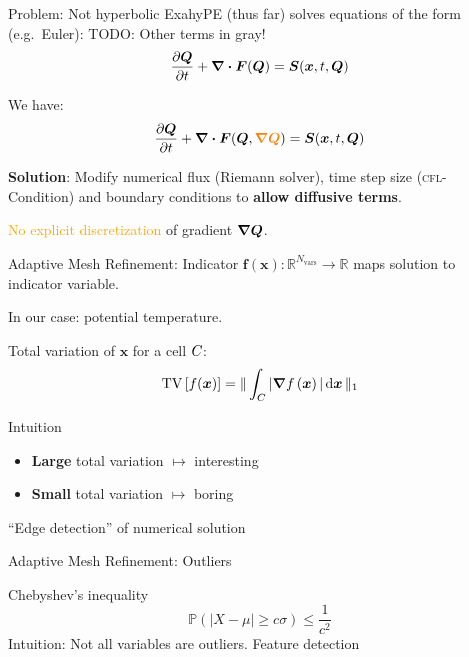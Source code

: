 \documentclass[aspectratio=169]{beamer}
\begin{document}
\begin{frame}{Problem: Not hyperbolic}
  ExahyPE (thus far) solves equations of the form (e.g.\ Euler):
  TODO: Other terms in gray!
  \begin{equation}
  \label{eq:conservation-law}
 \pdv{\Q}{t} + \divergence{\flux(\Q)} = \source(\bm{x}, t, \Q)
\end{equation}

We have:
\begin{equation}
  \label{eq:conservation-law-gradient}
 \pdv{\Q}{t} + \divergence{\flux(\Q, \textcolor{orange}{\gradQ})} = \source(\bm{x}, t, \Q)
\end{equation}

\textbf{Solution}:
Modify numerical flux (Riemann solver), time step size (\textsc{cfl}-Condition) and boundary conditions to \textbf{allow diffusive terms}.

\textcolor{orange}{No explicit discretization} of gradient $\gradQ$.
\end{frame}

\begin{frame}{Adaptive Mesh Refinement: Indicator}
  $\bm{f}(\bm{x}): \mathbb{R}^{N_\text{vars}} \to \mathbb{R}$ maps solution to indicator variable.

  In our case: potential temperature.

  Total variation of $\bm{x}$ for a cell $C_{}$:
\begin{equation}
  \label{eq:tv}
  \tv \left[ f(\bm{x}) \right] =
  \Vert
\intdcell{ \vert \gradient{f \left( \bm{x} \right)} \vert }
\Vert_1
\end{equation}

\begin{block}{Intuition}
  \begin{itemize}
\item \textbf{Large} total variation $\mapsto$ interesting
\item \textbf{Small} total variation $\mapsto$ boring
  \end{itemize}
  \enquote{Edge detection} of numerical solution
\end{block}

\end{frame}  

\begin{frame}{Adaptive Mesh Refinement: Outliers}
  \begin{block}{Chebyshev's inequality}
\begin{equation}
  \label{eq:chebychev}
  \mathbb{P}(\vert X - \mu \vert \geq c \sigma) \leq \frac{1}{c^2}
\end{equation}
Intuition: Not all variables are outliers.
Feature detection
\end{block}
\end{frame}
  
\end{document}
